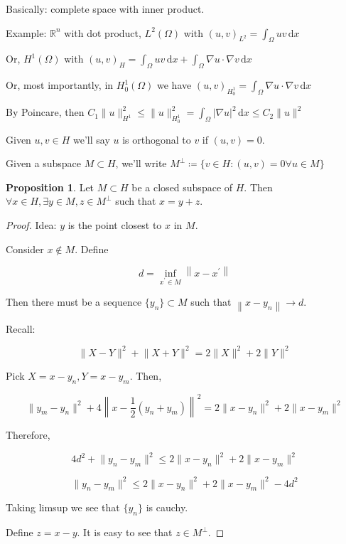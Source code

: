 \documentclass{article}
\theoremstyle{definition}
\newtheorem{proposition}{Proposition}
\begin{document}
Basically: complete space with inner product.

Example: \(\mathbb{R}^n\) with dot product, \(L^2(\Omega)\) with \((u,v)_{L^2} = \int_{\Omega}^{} uv \,\mathrm{d}x \)

Or, \(H^1(\Omega)\) with \((u,v)_H = \int_{\Omega}^{} uv \,\mathrm{d}x + \int_{\Omega}^{} \nabla u \cdot \nabla v \,\mathrm{d}x \)

Or, most importantly, in \(H_0^1(\Omega)\) we have \((u,v)_{H_0^1} = \int_{\Omega}^{} \nabla u \cdot \nabla v \,\mathrm{d}x\) 

By Poincare, then \(C_1 \lVert u \rVert ^2_{H^1} \leq \lVert u \rVert _{H_0^1}^2 = \int_{\Omega}^{} \vert \nabla u \vert ^2 \,\mathrm{d}x \leq C_2 \lVert u \rVert ^2\) 

Given \(u,v \in H\) we'll say \(u\) is orthogonal to \(v\) if \((u,v)=0\).

Given a subspace \(M \subset H\), we'll write \(M ^{\perp} \coloneqq \{ v\in H : (u,v) = 0 \forall u\in M \} \) 

\begin{proposition}
    Let \(M \subset H\) be a closed subspace of \(H\). Then \(\forall x \in H, \exists y\in M,z\in M ^{\perp}\) such that \(x = y + z\).  
\end{proposition}

\begin{proof}
    Idea: \(y\) is the point closest to \(x\) in \(M\).

    Consider \(x\notin M\). Define

    \[
        d = \inf_{x^{\prime} \in M} \left\lVert x - x^{\prime} \right\rVert 
    \]

    Then there must be a sequence \(\{ y_n \} \subset M\) such that \(\left\lVert x - y_n \right\rVert \to d\).

    Recall:

    \[
        \lVert X - Y \rVert ^2 + \lVert X + Y \rVert ^2 = 2 \lVert X \rVert ^2 + 2 \lVert Y \rVert^2
    \]

    Pick \(X = x-y_n, Y = x-y_m\). Then,

    \[
        \lVert y_m - y_n \rVert ^2 + 4 \left\lVert x - \frac{1}{2}(y_n + y_m) \right\rVert^2 = 2 \lVert x - y_n \rVert ^2+ 2 \lVert x - y_m \rVert ^2
    \]

    Therefore,

    \[
        4 d^2 + \lVert y_n - y_m \rVert ^2 \leq 2 \lVert x - y_n \rVert ^2 + 2\lVert x - y_m \rVert ^2
    \]

    \[
        \lVert y_n - y_m \rVert ^2 \leq 2 \lVert x - y_n \rVert ^2 + 2 \lVert x - y_m \rVert ^2 - 4d^2
    \]
    
    Taking limsup we see that \(\{ y_n \} \) is cauchy.

    Define \(z = x-y\). It is easy to see that \(z\in M ^{\perp}\).

\end{proof}
\end{document}
